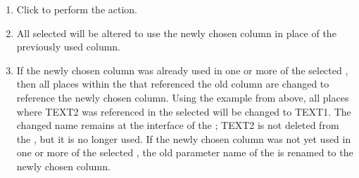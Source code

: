 \begin{enumerate}
\item Click  to perform the action. 
\item All selected \gdcases{} will be altered to use the newly chosen column in place of the previously used column. 
\item If the newly chosen column was already used in one or more of the selected \gdcases{}, then all places within the \gdcase{} that referenced the old column are changed to reference the newly chosen column. Using the example from above, all places where TEXT2 was referenced in the selected \gdcase{} will be changed to TEXT1. The changed name remains at the interface of the \gdcase{}; TEXT2 is not deleted from the \gdcase{}, but it is no longer used. If the newly chosen column was not yet used in one or more of the selected \gdcases{}, the old parameter name of the \gdcase{} is renamed to the newly chosen column. 
\end{enumerate}

